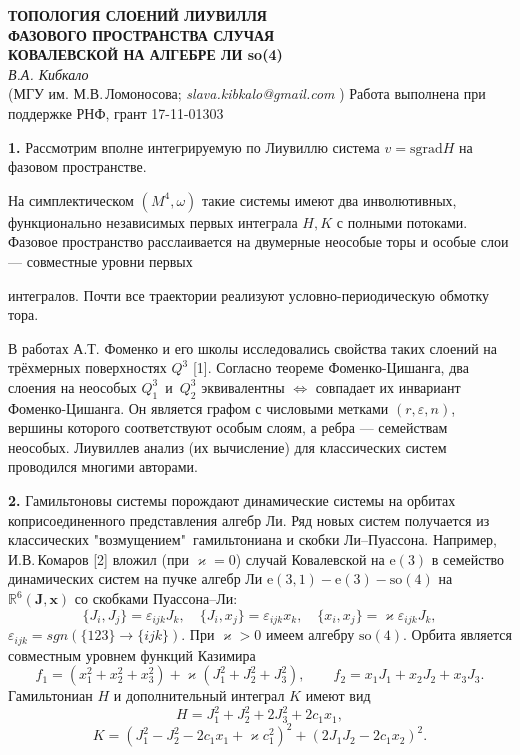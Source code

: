 \begin{center}{ \bf  ТОПОЛОГИЯ СЛОЕНИЙ ЛИУВИЛЛЯ \\
ФАЗОВОГО ПРОСТРАНСТВА СЛУЧАЯ \\
КОВАЛЕВСКОЙ НА АЛГЕБРЕ ЛИ so(4)}\\
{\it В.А. Кибкало } \\
(МГУ им. М.В.\,Ломоносова; {\it slava.kibkalo@gmail.com} )
Работа выполнена при поддержке РНФ, грант  17-11-01303
\end{center}


\textbf{1.} Рассмотрим вполне интегрируемую по Лиувиллю система $v = \textrm{sgrad} H$ на фазовом пространстве.

На симплектическом $(M^4, \omega)$ такие системы имеют два инволютивных, функционально независимых первых интеграла $H, K$ с полными потоками. Фазовое пространство расслаивается на двумерные неособые торы и особые слои --- совместные уровни первых{ интегралов. Почти все траектории реализуют условно-периодическую обмотку тора.

В работах А.Т. Фоменко и его школы исследовались свойства таких слоений на трёхмерных поверхностях $Q^3$ [1]. Согласно теореме Фоменко-Цишанга, два слоения на неособых $Q^3_1$~и~$Q^3_2$ эквивалентны $\Leftrightarrow$ совпадает их инвариант Фоменко-Цишанга. Он является графом с числовыми метками $(r, \varepsilon, n)$, вершины которого соответствуют особым слоям, а ребра --- семействам неособых. Лиувиллев анализ (их вычисление) для классических систем проводился многими авторами.

\textbf{2.}  Гамильтоновы системы порождают динамические системы на орбитах коприсоединенного представления алгебр Ли. Ряд новых систем получается из классических "возмущением"\ гамильтониана и скобки Ли--Пуассона. Например, И.В.\,Комаров [2] вложил (при $\varkappa =0$) случай Ковалевской на $\textrm{e}(3)$  в семейство динамических систем на пучке алгебр Ли $\textrm{e}(3,1)-\textrm{e}(3)-\textrm{so}(4)$ на $\mathbb{R}^6(\mathbf{J}, \mathbf{x})$ со скобками Пуассона--Ли: %
\[\{J_i, J_j\} =
\varepsilon_{ijk}J_k, \quad \{J_i, x_j\} = \varepsilon_{ijk}x_k,
\quad \{x_i, x_j\} = \varkappa \varepsilon_{ijk}J_k, \]%
$\varepsilon_{ijk} = sgn(\{123\} \rightarrow \{ijk\})$. При  $\varkappa>0$ имеем алгебру $\textrm{so}(4)$. Орбита является совместным уровнем функций Казимира
%
\[f_1 = (x_1^2 + x_2^2 + x_3^2) + \varkappa (J_1^2 +J_2^2 +J_3^2),
\qquad  f_2 = x_1 J_1 + x_2 J_2 +x_3 J_3.\]
%
Гамильтониан $H$ и дополнительный интеграл $K$ имеют вид
%
\[H = J_1^2 + J_2^2 + 2J_3^2 + 2 c_1 x_1, \]
\[K = (J_1^2 - J_2^2-2c_1 x_1 + \varkappa
c_1^2)^2 + (2J_1 J_2 - 2 c_1 x_2)^2.\]

}
